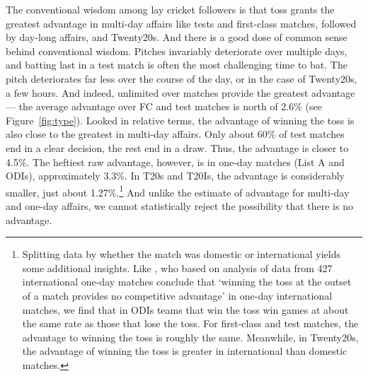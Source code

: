 \documentclass[12pt]{article}
\begin{document}
The conventional wisdom among lay cricket followers is that toss grants the greatest advantage in multi-day affairs like tests and first-class matches, followed by day-long affairs, and Twenty20s. And there is a good dose of common sense behind conventional wisdom. Pitches invariably deteriorate over multiple days, and batting last in a test match is often the most challenging time to bat. The pitch deteriorates far less over the course of the day, or in the case of Twenty20s, a few hours. And indeed, unlimited over matches provide the greatest advantage--- the average advantage over FC and test matches is north of 2.6\% (see Figure~\ref{fig:type}). Looked in relative terms, the advantage of winning the toss is also close to the greatest in multi-day affairs. Only about 60\% of test matches end in a clear decision, the rest end in a draw. Thus, the advantage is closer to 4.5\%. The heftiest raw advantage, however, is in one-day matches (List A and ODIs), approximately 3.3\%. In T20s and T20Is, the advantage is considerably smaller, just about 1.27\%.\footnote{Splitting data by whether the match was domestic or international yields some additional insights. Like \citet{de1998winning}, who based on analysis of data from 427 international one-day matches conclude that `winning the toss at the outset of a match provides no competitive advantage' in one-day international matches, we find that in ODIs teams that win the toss win games at about the same rate as those that lose the toss. For first-class and test matches, the advantage to winning the toss is roughly the same. Meanwhile, in Twenty20s, the advantage of winning the toss is greater in international than domestic matches.} And unlike the estimate of advantage for multi-day and one-day affairs, we cannot statistically reject the possibility that there is no advantage.
\end{document}
